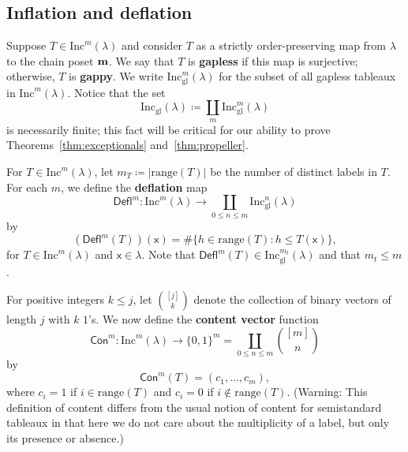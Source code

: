 \documentclass[12pt]{amsart}
\newcommand{\x}{\ensuremath{\mathsf{x}}}
\theoremstyle{definition}
\theoremstyle{remark}
\numberwithin{equation}{section}
\newcommand{\inc}{\ensuremath{\mathrm{Inc}}}
\newcommand{\incgl}{\inc_{\mathrm{gl}}}
\newcommand{\deflate}{\ensuremath{\mathsf{Defl}}}
\newcommand{\content}{\ensuremath{\mathsf{Con}}}
\begin{document}
\subsection{Inflation and deflation}
Suppose $T \in \inc^m(\lambda)$ and consider $T$ as a strictly order-preserving map from $\lambda$ to the chain poset ${\bf m}$. We say that $T$ is {\bf gapless} if this map is surjective; otherwise, $T$ is {\bf gappy}. We write $\incgl^m(\lambda)$ for the subset of all gapless tableaux in $\inc^m(\lambda)$. Notice that the set 
\[
\incgl(\lambda) \coloneqq \coprod_{m} \incgl^m(\lambda)
\]
is necessarily finite; this fact will be critical for our ability to prove Theorems~\ref{thm:exceptionals} and~\ref{thm:propeller}.

For $T \in \inc^m(\lambda)$, let $m_T \coloneqq |\mathrm{range}(T)|$ be the number of distinct labels in $T$. For each $m$, we define the {\bf deflation} map \[\deflate^m : \inc^m(\lambda) \to \coprod_{0 \leq n \leq m} \incgl^n(\lambda)\] by
\[
(\deflate^m(T))(\x) =
\# \{ h \in \mathrm{range}(T): h \leq T(\x) \} ,
\]
for $T \in \inc^m(\lambda)$ and $\x \in \lambda$. Note that $\deflate^m(T) \in \incgl^{m_t}(\lambda)$ and that $m_t \leq m$.

For positive integers $k \leq j$, let $\binom{[j]}{k}$ denote the collection of binary vectors of length $j$ with $k$ $1$'s. We now define the {\bf content vector} function 
\[
 \content^m : \inc^m(\lambda) \to \{ 0, 1\}^m = \coprod_{0 \leq  n \leq m} \binom{[m]}{n}
 \] 
 by 
\[
\content^m(T) = (c_1, \dots, c_m),
\] 
where $c_i = 1$ if $i \in \mathrm{range}(T)$ and $c_i = 0$ if $i \notin \mathrm{range}(T)$. (Warning: This definition of content differs from the usual notion of content for semistandard tableaux in that here we do not care about the multiplicity of a label, but only its presence or absence.)
\end{document}
